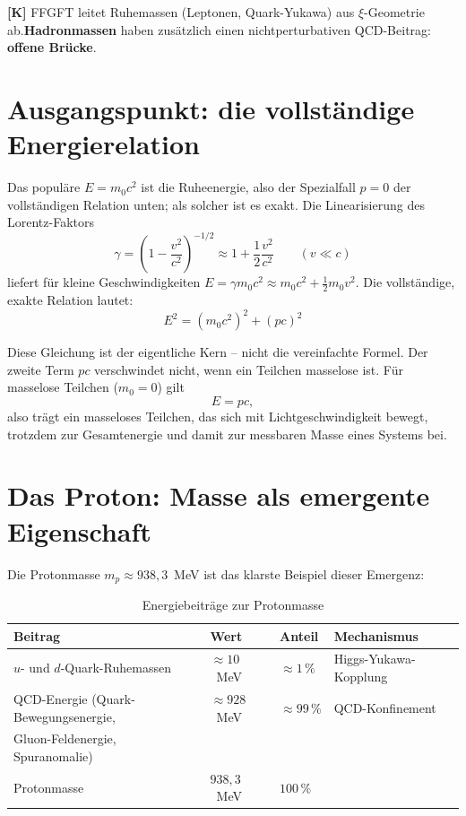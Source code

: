 \begin{keyresult}[Statusmarkierung]
\textbf{[K]} FFGFT leitet Ruhemassen (Leptonen, Quark-Yukawa) aus
$\xi$-Geometrie ab.\quad \textbf{Hadronmassen} haben zusätzlich einen
nichtperturbativen QCD-Beitrag: \textbf{offene Brücke}.
\end{keyresult}

\section{Ausgangspunkt: die vollständige Energierelation}

Das populäre $E = m_0 c^2$ ist die Ruheenergie, also der Spezialfall
$p = 0$ der vollständigen Relation unten; als solcher ist es exakt.
Die Linearisierung des Lorentz-Faktors
\begin{equation}
  \gamma = \left(1 - \frac{v^2}{c^2}\right)^{-1/2}
  \approx 1 + \frac{1}{2}\frac{v^2}{c^2}
  \qquad (v \ll c)
\end{equation}
liefert für kleine Geschwindigkeiten $E = \gamma m_0c^2 \approx m_0c^2
+ \tfrac12 m_0v^2$. Die vollständige,
exakte Relation lautet:
\begin{equation}
  \boxed{E^2 = (m_0 c^2)^2 + (pc)^2}
  \label{eq:volle_energie}
\end{equation}

Diese Gleichung ist der eigentliche Kern -- nicht die vereinfachte
Formel. Der zweite Term $pc$ verschwindet nicht, wenn ein Teilchen
masselose ist. Für masselose Teilchen ($m_0 = 0$) gilt
\begin{equation}
  E = pc,
\end{equation}
also trägt ein masseloses Teilchen, das sich mit Lichtgeschwindigkeit
bewegt, trotzdem zur Gesamtenergie und damit zur messbaren Masse
eines Systems bei.

\section{Das Proton: Masse als emergente Eigenschaft}

Die Protonmasse $m_p \approx 938{,}3$~MeV ist das klarste Beispiel
dieser Emergenz:

\begin{table}[h]
\centering
\caption{Energiebeiträge zur Protonmasse}
\label{tab:proton}
\begin{tabular}{llll}
\toprule
Beitrag & Wert & Anteil & Mechanismus \\
\midrule
$u$- und $d$-Quark-Ruhemassen & $\approx 10$~MeV & $\approx 1\,\%$
  & Higgs-Yukawa-Kopplung \\
QCD-Energie (Quark-Bewegungsenergie, & $\approx 928$~MeV & $\approx 99\,\%$
  & QCD-Konfinement \\
\quad Gluon-Feldenergie, Spuranomalie) & & & \\
\midrule
Protonmasse & $938{,}3$~MeV & $100\,\%$ & \\
\bottomrule
\end{tabular}
\end{table}

